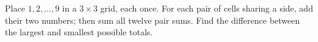Place $1,2,\ldots,9$ in a $3\times3$ grid, each once. For each pair of cells sharing a side, add their two numbers; then sum all twelve pair sums. Find the difference between the largest and smallest possible totals.
